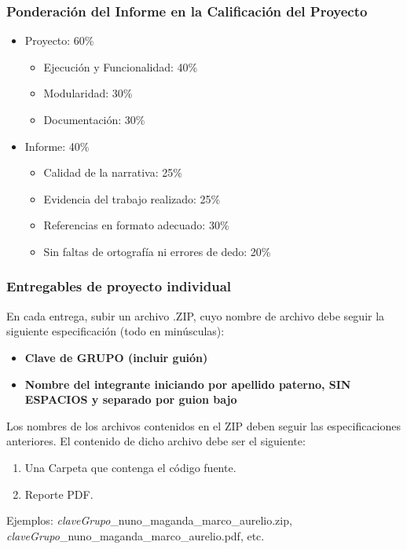 \begin{frame}
\frametitle{Ponderación del Informe en la Calificación del Proyecto}
\begin{itemize}
\item Proyecto: 60\%
\begin{itemize}
\item Ejecución y Funcionalidad: 40\%
\item Modularidad: 30\%
\item Documentación: 30\%
\end{itemize}
\item Informe: 40\%
\begin{itemize}
\item Calidad de la narrativa: 25\%
\item Evidencia del trabajo realizado: 25\%
\item Referencias en formato adecuado: 30\%
\item Sin faltas de ortografía ni errores de dedo: 20\%
\end{itemize}

\end{itemize}

\end{frame}



\begin{frame}
\frametitle{Entregables de proyecto individual}
En cada entrega, subir un archivo .ZIP, cuyo nombre de archivo debe seguir la siguiente especificación (todo en minúsculas):
\begin{itemize}
\item \textbf{Clave de GRUPO (incluir guión)}
\item \textbf{Nombre del integrante iniciando por apellido paterno, SIN ESPACIOS y separado por guion bajo}
\end{itemize}
Los nombres de los archivos contenidos en el ZIP deben seguir las especificaciones anteriores. El contenido de dicho archivo debe ser el siguiente:
\begin{enumerate}
\item Una Carpeta que contenga el código fuente. 
\item Reporte PDF. 
\end{enumerate}
Ejemplos: 
\textit{claveGrupo}\_nuno\_maganda\_marco\_aurelio.zip,  \textit{claveGrupo}\_nuno\_maganda\_marco\_aurelio.pdf, etc. 
\end{frame}



